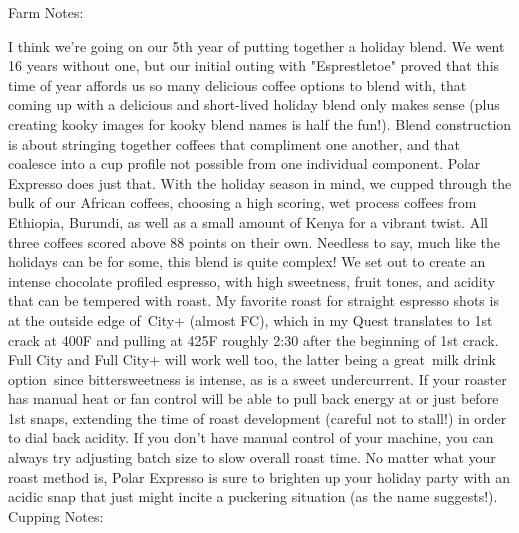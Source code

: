 \documentclass[10pt,twoside,footinclude=true,headinclude=true]{scrbook} %
\newlength{\mysize}
\newcommand{\myfontsize}[1]{
  \setlength{\mysize}{#1pt}
  \fontsize{\mysize}{1.2\mysize}
  \selectfont
}
\begin{document}

\newpage
\vspace*{-2.2em}
\linespread{1.2}
\raggedright
\normalsize
Farm Notes: \\
\myfontsize{7.5}
I think we're going on our 5th year of putting together a holiday blend. We went 16 years without one, but our initial outing with "Esprestletoe" proved that this time of year affords us so many delicious coffee options to blend with, that coming up with a delicious and short-lived holiday blend only makes sense (plus creating kooky images for kooky blend names is half the fun!). Blend construction is about stringing together coffees that compliment one another, and that coalesce into a cup profile not possible from one individual component. Polar Expresso does just that. With the holiday season in mind, we cupped through the bulk of our African coffees, choosing a high scoring, wet process coffees from Ethiopia, Burundi, as well as a small amount of Kenya for a vibrant twist. All three coffees scored above 88 points on their own. Needless to say, much like the holidays can be for some, this blend is quite complex! We set out to create an intense chocolate profiled espresso, with high sweetness, fruit tones, and acidity that can be tempered with roast. My favorite roast for straight espresso shots is at the outside edge of City+ (almost FC), which in my Quest translates to 1st crack at 400F and pulling at 425F roughly 2:30 after the beginning of 1st crack. Full City and Full City+ will work well too, the latter being a great milk drink option since bittersweetness is intense, as is a sweet undercurrent. If your roaster has manual heat or fan control will be able to pull back energy at or just before 1st snaps, extending the time of roast development (careful not to stall!) in order to dial back acidity. If you don't have manual control of your machine, you can always try adjusting batch size to slow overall roast time. No matter what your roast method is, Polar Expresso is sure to brighten up your holiday party with an acidic snap that just might incite a puckering situation (as the name suggests!). \\
\medskip
\normalsize
Cupping Notes: \\
\end{document}
